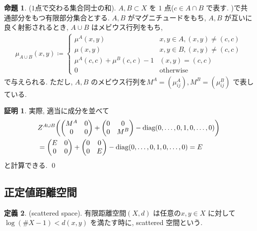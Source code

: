 \documentclass[10pt, fleqn, label-section=none]{bxjsarticle}
\theoremstyle{definition}
\newtheorem{dfn}{定義}[section]
\newtheorem{prop}[dfn]{命題}
\newtheorem*{pf*}{証明}
\newcommand{\paren}[1]{\mleft( #1\mright )}
\newcommand{\diag}{\textrm{diag}}
\renewcommand{\;}{\, ; \,}
\newcommand{\gyouretsu}[1]{\begin{pmatrix} #1 \end{pmatrix} }
\begin{document}
\begin{prop}($1$点で交わる集合同士の和). $A, B \subset X$ を $1$ 点($c \in A\cap B$ で表す. )で共通部分をもつ有限部分集合とする. $A, B$ がマグニチュードをもち, $A, B$ が互いに良く射影されるとき, $A \cup B$ はメビウス行列をもち, 
\begin{align*} \mu_{A \cup B}( x, y) \coloneqq \begin{cases} \mu^A(x, y)  & x, y \in A, (x, y) \neq  (c, c) \\ \mu(x, y)  & x, y \in B , (x, y) \neq  (c, c) \\ \mu^A(c, c) + \mu^B (c, c) - 1 & (x, y) = (c, c)  \\ 0 & \textrm{otherwise} \end{cases} \end{align*}
で与えられる. ただし, $A, B$ のメビウス行列を$M^A = (\mu^A_{ij}), M^B = (\mu^B_{ij})$ で表している. 

\end{prop}
\begin{pf*}実際, 適当に成分を並べて
\begin{align*} &Z^{A\cup B} \paren{ \gyouretsu{ M^A & 0 \\ 0 & 0   } + \gyouretsu{ 0 & 0 \\ 0 & M^B   } - \diag(0, \ldots ,0,  1 , 0, \ldots , 0) }  \\ & =   \gyouretsu{ E & 0 \\ 0 & 0   } +  \gyouretsu{ 0 & 0 \\ 0 & E   } -  \diag(0, \ldots ,0,  1 , 0, \ldots , 0)  = E \end{align*}
と計算できる. 
\qed
\end{pf*}



\subsection{正定値距離空間}


\begin{dfn}(scattered space). 有限距離空間$(X, d)$ は任意の$x, y \in X$ に対して$\log(\# X - 1) < d(x, y)$ を満たす時に, scattered 空間という. 

\end{dfn}
\end{document}
